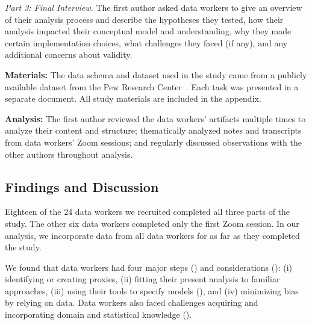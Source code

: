 \textit{Part 3: Final Interview.} The first author asked data workers to give an
overview of their analysis process and describe the hypotheses they tested, how
their analysis impacted their conceptual model and understanding, why they made
certain implementation choices, what challenges they faced (if any), and any
additional concerns about validity.

\noindent\textbf{Materials:} The data schema and dataset used in the study came from a
publicly available dataset from the Pew Research Center~\cite{pewDataset}. Each
task was presented in a separate document. All study materials are included in the appendix.

\noindent\textbf{Analysis:} The first author reviewed the data workers' artifacts multiple
times to analyze their content and structure;
thematically analyzed notes and transcripts from data workers' Zoom sessions;
and regularly discussed observations with the other authors throughout analysis.

\subsection{Findings and Discussion} 


Eighteen of the 24 data workers we recruited completed all three parts of the study.
The other six data workers completed only the first Zoom session. In our analysis,
we incorporate data from all data workers for as far as they completed the study. 

We found that data workers had four major steps (\rqSteps) and considerations
(\rqProcess): (i) identifying or creating proxies, (ii) fitting their present
analysis to familiar approaches, (iii) using their tools to specify models
(\rqTools), and (iv) minimizing bias by relying on data. Data workers also faced
challenges acquiring and incorporating domain and statistical knowledge
(\rqProcess).

